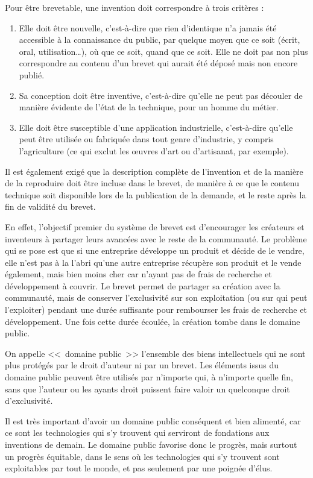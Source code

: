 Pour être brevetable, une invention doit correspondre à trois critères :
\begin{enumerate}
\item Elle doit être nouvelle, c'est-à-dire que rien d'identique n'a jamais été accessible à la connaissance du public, par quelque moyen que ce soit (écrit, oral, utilisation\dots{}), où que ce soit, quand que ce soit. Elle ne doit pas non plus correspondre au contenu d'un brevet qui aurait été déposé mais non encore publié.
\item Sa conception doit être inventive, c'est-à-dire qu'elle ne peut pas découler de manière évidente de l'état de la technique, pour un homme du métier.
\item Elle doit être susceptible d'une application industrielle, c'est-à-dire qu'elle peut être utilisée ou fabriquée dans tout genre d'industrie, y compris l'agriculture (ce qui exclut les œuvres d'art ou d'artisanat, par exemple).
\end{enumerate}\bigskip

Il est également exigé que la description complète de l'invention et de la manière de la reproduire doit être incluse dans le brevet, de manière à ce que le contenu technique soit disponible lors de la publication de la demande, et le reste après la fin de validité du brevet.

En effet, l'objectif premier du système de brevet est d'encourager les créateurs et inventeurs à partager leurs avancées avec le reste de la communauté.
Le problème qui se pose est que si une entreprise développe un produit et décide de le vendre, elle n'est pas à la l'abri qu'une autre entreprise récupère son produit et le vende également, mais bien moins cher car n'ayant pas de frais de recherche et développement à couvrir.
Le brevet permet de partager sa création avec la communauté, mais de conserver l'exclusivité sur son exploitation (ou sur qui peut l'exploiter) pendant une durée suffisante pour rembourser les frais de recherche et développement.
Une fois cette durée écoulée, la création tombe dans le domaine public.

On appelle <<~domaine public~>> l'ensemble des biens intellectuels qui ne sont plus protégés par le droit d'auteur ni par un brevet.
Les éléments issus du domaine public peuvent être utilisés par n'importe qui, à n'importe quelle fin, sans que l'auteur ou les ayants droit puissent faire valoir un quelconque droit d'exclusivité.

Il est très important d'avoir un domaine public conséquent et bien alimenté, car ce sont les technologies qui s'y trouvent qui serviront de fondations aux inventions de demain.
Le domaine public favorise donc le progrès, mais surtout un progrès équitable, dans le sens où les technologies qui s'y trouvent sont exploitables par tout le monde, et pas seulement par une poignée d'élus.

